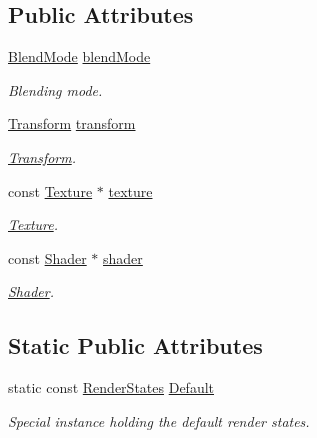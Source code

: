 \subsection*{Public Attributes}
\begin{DoxyCompactItemize}
\item 
\hyperlink{group__graphics_ga80c52fe2f7050d7f7573b7ed3c995388}{Blend\-Mode} \hyperlink{classsf_1_1_render_states_ad6ac87f1b5006dae7ebfee4b5d40f5a8}{blend\-Mode}
\begin{DoxyCompactList}\small\item\em Blending mode. \end{DoxyCompactList}\item 
\hyperlink{classsf_1_1_transform}{Transform} \hyperlink{classsf_1_1_render_states_a1f737981a0f2f0d4bb8dac866a8d1149}{transform}
\begin{DoxyCompactList}\small\item\em \hyperlink{classsf_1_1_transform}{Transform}. \end{DoxyCompactList}\item 
const \hyperlink{classsf_1_1_texture}{Texture} $\ast$ \hyperlink{classsf_1_1_render_states_a457fc5a41731889de9cf39cf9b3436c3}{texture}
\begin{DoxyCompactList}\small\item\em \hyperlink{classsf_1_1_texture}{Texture}. \end{DoxyCompactList}\item 
const \hyperlink{classsf_1_1_shader}{Shader} $\ast$ \hyperlink{classsf_1_1_render_states_ad4f79ecdd0c60ed0d24fbe555b221bd8}{shader}
\begin{DoxyCompactList}\small\item\em \hyperlink{classsf_1_1_shader}{Shader}. \end{DoxyCompactList}\end{DoxyCompactItemize}
\subsection*{Static Public Attributes}
\begin{DoxyCompactItemize}
\item 
static const \hyperlink{classsf_1_1_render_states}{Render\-States} \hyperlink{classsf_1_1_render_states_ad29672df29f19ce50c3021d95f2bb062}{Default}
\begin{DoxyCompactList}\small\item\em Special instance holding the default render states. \end{DoxyCompactList}\end{DoxyCompactItemize}


